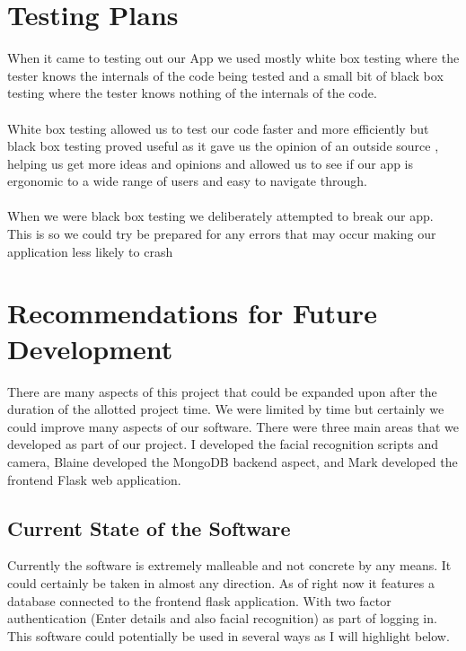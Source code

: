 \documentclass{article}
\begin{document}
\newpage

\section{Testing Plans}

When it came to testing out our App we used mostly white box testing where the tester knows the internals of the code being tested and a small bit of black box testing where the tester knows nothing of the internals of the code.
\\ \\
White box testing allowed us to test our code faster and more efficiently but black box testing proved useful as it gave us the opinion of an outside source  , helping us get more ideas and opinions and allowed us to see if our app is ergonomic to a wide range of users and easy to navigate through.
\\ \\
When we were black box testing we deliberately attempted to break our app. This is so we could try be prepared for any errors that may occur making our application less likely to crash

\newpage

\section{Recommendations for Future Development}
There are many aspects of this project that could be expanded upon after the duration of the allotted project time. We were limited by time but certainly we could improve many aspects of our software. There were three main areas that we developed as part of our project. I developed the facial recognition scripts and camera, Blaine developed the MongoDB backend aspect\cite{mongodb}, and Mark developed the frontend Flask web application.\cite{flask}
\\
\subsection{Current State of the Software}
Currently the software is extremely malleable and not concrete by any means. It could certainly be taken in almost any direction. As of right now it features a database connected to the frontend flask application. With two factor authentication (Enter details and also facial recognition) as part of logging in. This software could potentially be used in several ways as I will highlight below.
\end{document}
